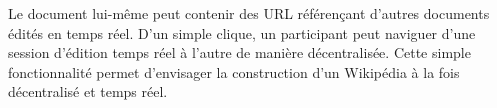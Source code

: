 
Le document lui-même peut contenir des URL référençant d'autres documents édités
en temps réel. D'un simple clique, un participant peut naviguer d'une session
d'édition temps réel à l'autre de manière décentralisée. Cette simple
fonctionnalité permet d'envisager la construction d'un Wikipédia à la fois
décentralisé et temps réel. 


